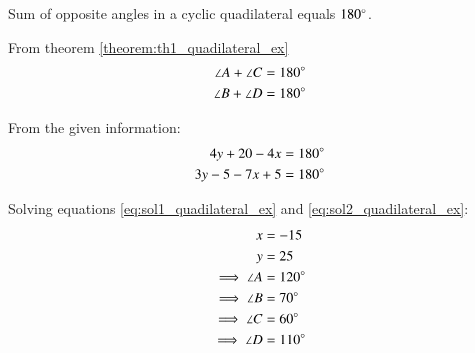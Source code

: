 \begin{theorem}\label{theorem:th1_quadilateral_ex}
Sum of opposite angles in a cyclic quadilateral equals $180\degree$.
\end{theorem}
\solution  From theorem \ref{theorem:th1_quadilateral_ex}
\begin{align}
\angle A + \angle C &=  180\degree\\
\angle B + \angle D &=  180\degree
\end{align}

From the given information:
\begin{align}
4y+20-4x &= 180\degree \label{eq:sol1_quadilateral_ex} \\
3y-5-7x+5 &= 180\degree \label{eq:sol2_quadilateral_ex}
\end{align}

Solving equations \ref{eq:sol1_quadilateral_ex} and \ref{eq:sol2_quadilateral_ex}:
\begin{align}
x &= -15 \\
y &= 25 \\
\implies \angle A &= 120\degree \\
\implies \angle B &= 70\degree \\
\implies \angle C &= 60\degree \\
\implies \angle D &= 110\degree 
\end{align}




